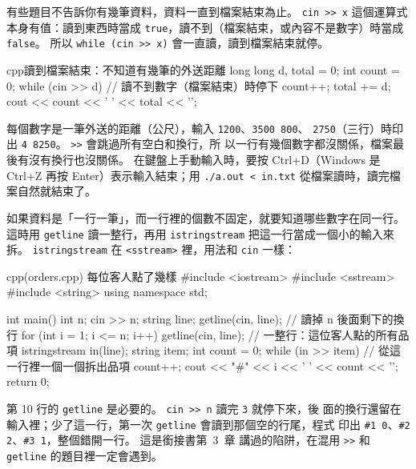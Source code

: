 有些題目不告訴你有幾筆資料，資料一直到檔案結束為止。 \texttt{cin >> x} 這個運算式
本身有值：讀到東西時當成 \texttt{true}，讀不到（檔案結束，或內容不是數字）時當成
\texttt{false}。 所以 \texttt{while (cin >> x)} 會一直讀，讀到檔案結束就停。

\begin{code}[label=code:delivery]{cpp}{讀到檔案結束：不知道有幾筆的外送距離}
long long d, total = 0;
int count = 0;
while (cin >> d) {              // 讀不到數字（檔案結束）時停下
    count++;
    total += d;
}
cout << count << ' ' << total << '\n';
\end{code}

每個數字是一筆外送的距離（公尺），輸入 \texttt{1200}、\texttt{3500 800}、
\texttt{2750}（三行）時印出 \texttt{4 8250}。 \texttt{>>} 會跳過所有空白和換行，所
以一行有幾個數字都沒關係，檔案最後有沒有換行也沒關係。 在鍵盤上手動輸入時，要按
Ctrl+D（Windows 是 Ctrl+Z 再按 Enter）表示輸入結束；用 \texttt{./a.out < in.txt}
從檔案讀時，讀完檔案自然就結束了。

如果資料是「一行一筆」，而一行裡的個數不固定，就要知道哪些數字在同一行。 這時用
\texttt{getline} 讀一整行，再用 \texttt{istringstream} 把這一行當成一個小的輸入來拆。
\texttt{istringstream} 在 \texttt{<sstream>} 裡，用法和 \texttt{cin} 一樣：

\begin{example}[label=ex:orders]{cpp}{(orders.cpp) 每位客人點了幾樣}
#include <iostream>
#include <sstream>
#include <string>
using namespace std;

int main() {
    int n;
    cin >> n;
    string line;
    getline(cin, line);             // 讀掉 n 後面剩下的換行
    for (int i = 1; i <= n; i++) {
        getline(cin, line);         // 一整行：這位客人點的所有品項
        istringstream in(line);
        string item;
        int count = 0;
        while (in >> item) {        // 從這一行裡一個一個拆出品項
            count++;
        }
        cout << "#" << i << ' ' << count << '\n';
    }
    return 0;
}
\end{example}


第 10 行的 \texttt{getline} 是必要的。 \texttt{cin >> n} 讀完 \texttt{3} 就停下來，後
面的換行還留在輸入裡；少了這一行，第一次 \texttt{getline} 會讀到那個空的行尾，程式
印出 \texttt{\#1 0}、\texttt{\#2 2}、\texttt{\#3 1}，整個錯開一行。 這是銜接書第~3~章
講過的陷阱，在混用 \texttt{>>} 和 \texttt{getline} 的題目裡一定會遇到。

